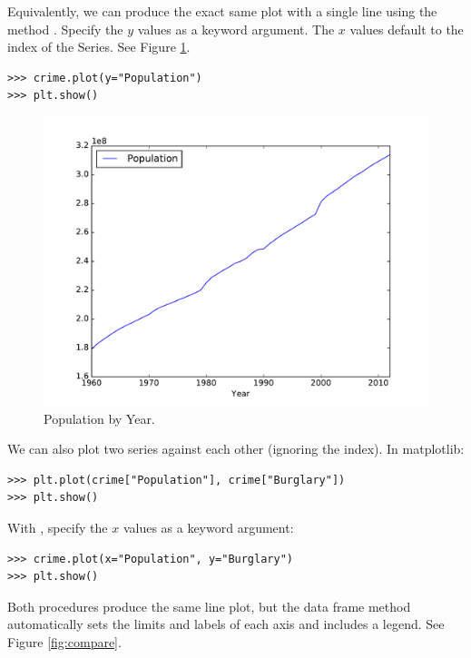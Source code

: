 Equivalently, we can produce the exact same plot with a single line using the  method .
Specify the $y$ values as a keyword argument.
The $x$ values default to the index of the Series.
See Figure \ref{fig:intro}.

\begin{lstlisting}
>>> crime.plot(y="Population")
>>> plt.show()
\end{lstlisting}


\begin{figure}[H] %
    \centering
    \includegraphics[scale=.5]{population.pdf}
    \caption{Population by Year.}
    \label{fig:intro}
\end{figure}

We can also plot two series against each other (ignoring the index).
In matplotlib:

\begin{lstlisting}
>>> plt.plot(crime["Population"], crime["Burglary"])
>>> plt.show()
\end{lstlisting}

With , specify the $x$ values as a keyword argument:

\begin{lstlisting}
>>> crime.plot(x="Population", y="Burglary")
>>> plt.show()
\end{lstlisting}

Both procedures produce the same line plot, but the data frame method automatically sets the limits and labels of each axis and includes a legend.
See Figure \ref{fig:compare}.

